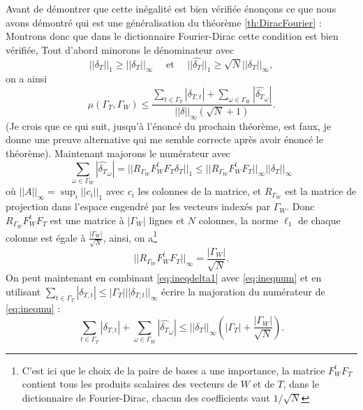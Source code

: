 	Avant de démontrer que cette inégalité est bien vérifiée énonçons ce que nous avons démontré qui est une généralisation du théorème \ref{th:DiracFourier} :
		Montrons donc que dans le dictionnaire Fourier-Dirac cette condition est bien vérifiée,
	Tout d'abord minorons le dénominateur avec 
	\begin{equation}
		||\delta_T||_1 \geq ||\delta_T||_{\infty} \quad \text{ et } \quad ||\widehat{\delta_T}||_1 \geq \sqrt{N}||\delta_T||_\infty,
	\end{equation}
	on a ainsi
	\begin{equation}\label{eq:ineqmu}
		\mu(\Gamma_T, \Gamma_W) \leq \frac{\sum_{t \in \Gamma_T} |\delta_{T, t}| + \sum_{\omega \in \Gamma_W} |\widehat{\delta_{T}}_\omega|}{||\delta||_{\infty}(\sqrt{N} + 1)}. 
	\end{equation}
	(Je crois que ce qui suit, jusqu'à l'énoncé du prochain théorème,  est faux, je donne une preuve alternative qui me semble correcte après avoir énoncé le théorème).
	Maintenant majorons le numérateur avec 
	\begin{equation}\label{eq:ineqnum}
		\sum_{\omega \in \Gamma_W} |\widehat{\delta_T}_\omega| = ||R_{\Gamma_W} F_W^t F_T \delta_T||_1 \leq ||R_{\Gamma_W} F_W^t F_T ||_\infty ||\delta_T||_\infty 
	\end{equation}
	où $||A||_\infty = \sup_i ||c_i||_1$ avec $c_i$ les colonnes de la matrice, et $R_{\Gamma_W}$ est la matrice de projection dans l'espace engendré par les vecteurs indexés par $\Gamma_W$.
	Donc $R_{\Gamma_W} F_W^t F_T$ est une matrice à $|\Gamma_W|$ lignes et $N$ colonnes, la norme $\ell_1$ de chaque colonne est égale à $\frac{|\Gamma_W|}{\sqrt{N}}$, ainsi, on a\footnote{C'est ici que le choix de la paire de bases a une importance, la matrice $F_W^t F_T$ contient tous les produits scalaires des vecteurs de $W$ et de $T$, dans le dictionnaire de Fourier-Dirac, chacun des coefficients vaut $1/\sqrt{N}$}
	\begin{equation}\label{eq:ineqdelta1}
		||R_{\Gamma_W} F_W^t F_T||_\infty = \frac{|\Gamma_W|}{\sqrt{N}}.
	\end{equation}
	On peut maintenant en combinant \ref{eq:ineqdelta1} avec \ref{eq:ineqnum} et en utilisant $\sum_{t\in \Gamma_T} |\delta_{T, t}| \leq |\Gamma_T|||\delta_{T,t}||_\infty$ écrire la majoration du numérateur de \ref{eq:ineqmu} :
	\begin{equation}
		\sum_{t \in \Gamma_T} |\delta_{T, t}| + \sum_{\omega \in \Gamma_W} |\widehat{\delta_T}_\omega| 
		\leq ||\delta_{T}||_\infty (|\Gamma_T| + \frac{|\Gamma_W|}{\sqrt{N}}). 
	\end{equation}
